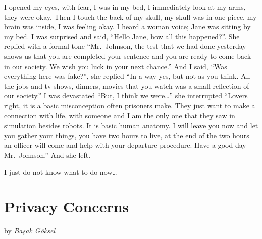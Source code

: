 \documentclass[]{book}
\begin{document}
I opened my eyes, with fear, I was in my bed, I immediately look at my arms, they were okay. Then I touch the back of my skull, my skull was in one piece, my brain was inside, I was feeling okay. I heard a woman voice; Jane was sitting by my bed. I was surprised and said, ``Hello Jane, how all this happened?''. She replied with a formal tone ``Mr.~Johnson, the test that we had done yesterday shows us that you are completed your sentence and you are ready to come back in our society. We wish you luck in your next chance.'' And I said, ``Was everything here was fake?'', she replied ``In a way yes, but not as you think. All the jobs and tv shows, dinners, movies that you watch was a small reflection of our society.'' I was devastated ``But, I think we were\ldots{}'' she interrupted ``Lovers right, it is a basic misconception often prisoners make. They just want to make a connection with life, with someone and I am the only one that they saw in simulation besides robots. It is basic human anatomy. I will leave you now and let you gather your things, you have two hours to live, at the end of the two hours an officer will come and help with your departure procedure. Have a good day Mr.~Johnson.'' And she left.

I just do not know what to do now\ldots{}

\hypertarget{privacy-concerns}{%
\chapter{Privacy Concerns}\label{privacy-concerns}}

by \emph{Başak Göksel}
\end{document}
